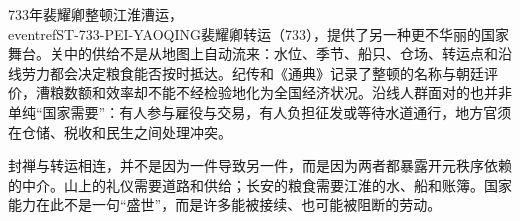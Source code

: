 733年裴耀卿整顿江淮漕运，\\eventref{ST-733-PEI-YAOQING}{裴耀卿转运（733）}，提供了另一种更不华丽的国家舞台。关中的供给不是从地图上自动流来：水位、季节、船只、仓场、转运点和沿线劳力都会决定粮食能否按时抵达。纪传和《通典》记录了整顿的名称与朝廷评价，漕粮数额和效率却不能不经检验地化为全国经济状况。沿线人群面对的也并非单纯“国家需要”：有人参与雇役与交易，有人负担征发或等待水道通行，地方官须在仓储、税收和民生之间处理冲突。

封禅与转运相连，并不是因为一件导致另一件，而是因为两者都暴露开元秩序依赖的中介。山上的礼仪需要道路和供给；长安的粮食需要江淮的水、船和账簿。国家能力在此不是一句“盛世”，而是许多能被接续、也可能被阻断的劳动。\endinput
